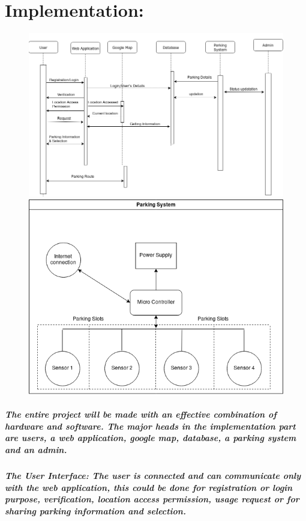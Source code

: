 \documentclass[]{article}
\begin{document}
\section{Implementation:}
\begin{figure}[ht]
    \centering
    \includegraphics[width=12cm]{i.png}
    \linebreak
    \linebreak
    \includegraphics[width=12cm]{i2.png}
    \end{figure}
\subparagraph{The entire project will be made with an effective combination of hardware and software. The major heads in the implementation part are users, a web application, google map, database, a parking system and an admin.}
\subparagraph{\textbf{The User Interface:\newline}
The user is connected and can communicate only with the web application, this could be done for registration or login purpose, verification, location access permission, usage request or for sharing parking information and selection.}
\end{document}
